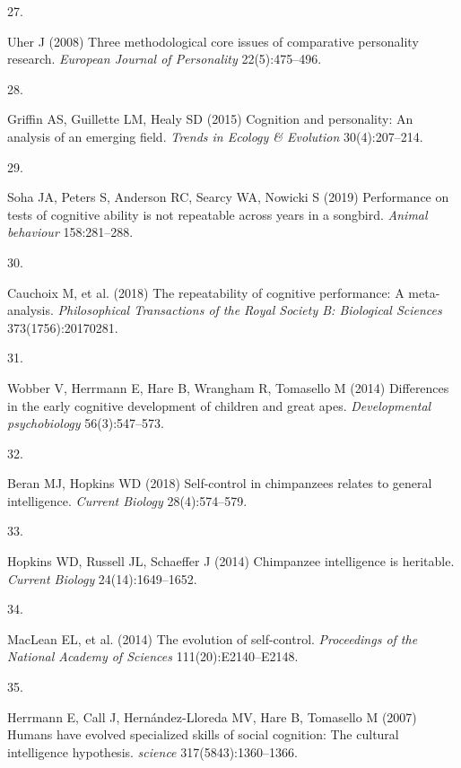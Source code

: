 \documentclass[
  man,floatsintext]{apa6}
\newlength{\cslhangindent}
\newlength{\csllabelwidth}
\newlength{\cslentryspacingunit} %
\newenvironment{CSLReferences}[2] %
 {%
  \setlength{\parindent}{0pt}
  \ifodd #1
  \let\oldpar\par
  \def\par{\hangindent=\cslhangindent\oldpar}
  \fi
  \setlength{\parskip}{#2\cslentryspacingunit}
 }%
 {}
\newcommand{\CSLLeftMargin}[1]{\parbox[t]{\csllabelwidth}{#1}}
\newcommand{\CSLRightInline}[1]{\parbox[t]{\linewidth - \csllabelwidth}{#1}\break}
\begin{document}
\begin{CSLReferences}{0}{0}
\leavevmode{}%
\CSLLeftMargin{27. }%
\CSLRightInline{Uher J (2008) Three methodological core issues of comparative personality research. \emph{European Journal of Personality} 22(5):475--496.}

\leavevmode{}%
\CSLLeftMargin{28. }%
\CSLRightInline{Griffin AS, Guillette LM, Healy SD (2015) Cognition and personality: An analysis of an emerging field. \emph{Trends in Ecology \& Evolution} 30(4):207--214.}

\leavevmode{}%
\CSLLeftMargin{29. }%
\CSLRightInline{Soha JA, Peters S, Anderson RC, Searcy WA, Nowicki S (2019) Performance on tests of cognitive ability is not repeatable across years in a songbird. \emph{Animal behaviour} 158:281--288.}

\leavevmode{}%
\CSLLeftMargin{30. }%
\CSLRightInline{Cauchoix M, et al. (2018) The repeatability of cognitive performance: A meta-analysis. \emph{Philosophical Transactions of the Royal Society B: Biological Sciences} 373(1756):20170281.}

\leavevmode{}%
\CSLLeftMargin{31. }%
\CSLRightInline{Wobber V, Herrmann E, Hare B, Wrangham R, Tomasello M (2014) Differences in the early cognitive development of children and great apes. \emph{Developmental psychobiology} 56(3):547--573.}

\leavevmode{}%
\CSLLeftMargin{32. }%
\CSLRightInline{Beran MJ, Hopkins WD (2018) Self-control in chimpanzees relates to general intelligence. \emph{Current Biology} 28(4):574--579.}

\leavevmode{}%
\CSLLeftMargin{33. }%
\CSLRightInline{Hopkins WD, Russell JL, Schaeffer J (2014) Chimpanzee intelligence is heritable. \emph{Current Biology} 24(14):1649--1652.}

\leavevmode{}%
\CSLLeftMargin{34. }%
\CSLRightInline{MacLean EL, et al. (2014) The evolution of self-control. \emph{Proceedings of the National Academy of Sciences} 111(20):E2140--E2148.}

\leavevmode{}%
\CSLLeftMargin{35. }%
\CSLRightInline{Herrmann E, Call J, Hernández-Lloreda MV, Hare B, Tomasello M (2007) Humans have evolved specialized skills of social cognition: The cultural intelligence hypothesis. \emph{science} 317(5843):1360--1366.}


\end{CSLReferences}
\end{document}
